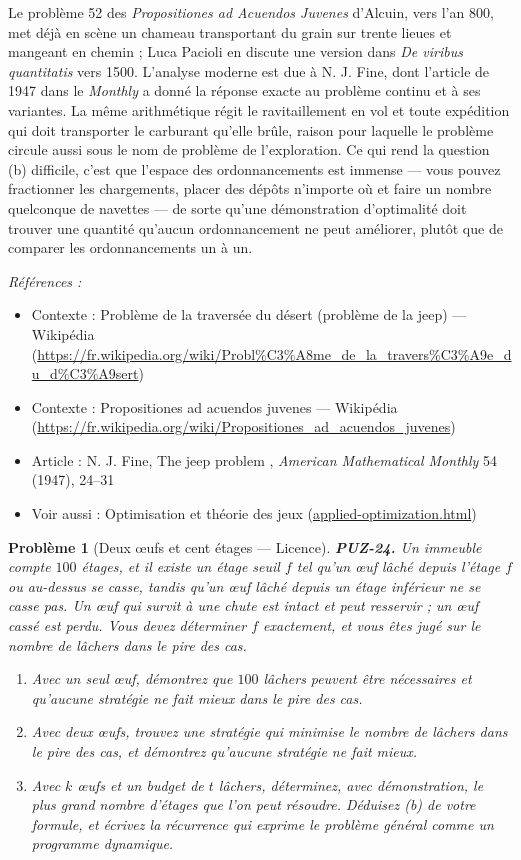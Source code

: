 \documentclass[11pt]{article}
\newtheorem{problem}{Problème}
\newenvironment{refs}{\par\small\noindent\emph{Références :}\begin{itemize}\setlength\itemsep{0pt}}{\end{itemize}\normalsize}
\begin{document}
\noindent Le problème 52 des \textit{Propositiones ad Acuendos Juvenes} d'Alcuin, vers l'an 800, met déjà en scène un chameau transportant du grain sur trente lieues et mangeant en chemin ; Luca Pacioli en discute une version dans \textit{De viribus quantitatis} vers 1500. L'analyse moderne est due à N. J. Fine, dont l'article de 1947 dans le \textit{Monthly} a donné la réponse exacte au problème continu et à ses variantes. La même arithmétique régit le ravitaillement en vol et toute expédition qui doit transporter le carburant qu'elle brûle, raison pour laquelle le problème circule aussi sous le nom de problème de l'exploration. Ce qui rend la question (b) difficile, c'est que l'espace des ordonnancements est immense --- vous pouvez fractionner les chargements, placer des dépôts n'importe où et faire un nombre quelconque de navettes --- de sorte qu'une démonstration d'optimalité doit trouver une quantité qu'aucun ordonnancement ne peut améliorer, plutôt que de comparer les ordonnancements un à un.

\begin{refs}
\item Contexte : Problème de la traversée du désert (problème de la jeep) --- Wikipédia (\url{https://fr.wikipedia.org/wiki/Probl%C3%A8me_de_la_travers%C3%A9e_du_d%C3%A9sert})
\item Contexte : Propositiones ad acuendos juvenes --- Wikipédia (\url{https://fr.wikipedia.org/wiki/Propositiones_ad_acuendos_juvenes})
\item Article : N. J. Fine, \og{} The jeep problem \fg{}, \textit{American Mathematical Monthly} 54 (1947), 24--31
\item Voir aussi : Optimisation et théorie des jeux (\url{applied-optimization.html})
\end{refs}

\bigskip

\begin{problem}[{Deux \oe{}ufs et cent étages --- Licence}]
\textbf{PUZ-24.} Un immeuble compte $ 100 $ étages, et il existe un étage seuil $ f $ tel qu'un \oe{}uf lâché depuis l'étage $ f $ ou au-dessus se casse, tandis qu'un \oe{}uf lâché depuis un étage inférieur ne se casse pas. Un \oe{}uf qui survit à une chute est intact et peut resservir ; un \oe{}uf cassé est perdu. Vous devez déterminer $ f $ exactement, et vous êtes jugé sur le nombre de lâchers dans le pire des cas.
\begin{enumerate}
\item[(a)] Avec un seul \oe{}uf, démontrez que $ 100 $ lâchers peuvent être nécessaires et qu'aucune stratégie ne fait mieux dans le pire des cas.
\item[(b)] Avec deux \oe{}ufs, trouvez une stratégie qui minimise le nombre de lâchers dans le pire des cas, et démontrez qu'aucune stratégie ne fait mieux.
\item[(c)] Avec $ k $ \oe{}ufs et un budget de $ t $ lâchers, déterminez, avec démonstration, le plus grand nombre d'étages que l'on peut résoudre. Déduisez (b) de votre formule, et écrivez la récurrence qui exprime le problème général comme un programme dynamique.
\end{enumerate}

\end{problem}
\end{document}
